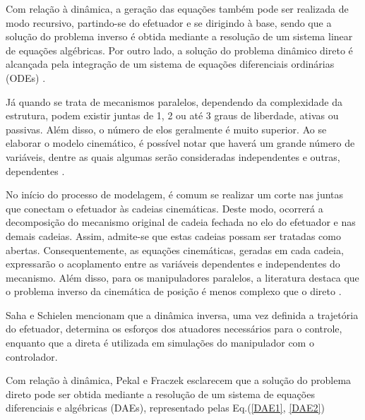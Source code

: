 \documentclass[]{politex}
\begin{document}
Com relação à dinâmica, a geração das equações também pode ser realizada de modo recursivo, partindo-se do efetuador e se dirigindo à base, sendo que a solução do problema inverso é obtida mediante a resolução de um sistema linear de equações algébricas. Por outro lado, a solução do problema dinâmico direto é alcançada pela integração de um sistema de equações diferenciais ordinárias (ODEs) \cite{Featherstone}.





Já quando se trata de mecanismos paralelos, dependendo da complexidade da estrutura, podem existir juntas de 1, 2 ou até 3 graus de liberdade, ativas ou passivas. Além disso, o número de elos geralmente é muito superior. Ao se elaborar o modelo cinemático, é possível notar que haverá um grande número de variáveis, dentre as quais algumas serão consideradas independentes e outras, dependentes \cite{Merlet}.

No início do processo de modelagem, é comum  se realizar um corte nas juntas que conectam o efetuador às cadeias cinemáticas. Deste modo, ocorrerá a decomposição do mecanismo original de cadeia fechada no elo do efetuador e nas demais cadeias. Assim, admite-se que estas cadeias possam ser tratadas como abertas. Consequentemente, as equações cinemáticas, geradas em cada cadeia, expressarão o acoplamento entre as variáveis dependentes e independentes do mecanismo. Além disso, para os manipuladores paralelos, a literatura destaca que o problema inverso da cinemática de posição é menos complexo que o direto \cite{Merlet}. 

Saha e Schielen \cite{Saha} mencionam que a dinâmica inversa, uma vez definida a trajetória do efetuador, determina os esforços dos atuadores necessários para o controle, enquanto que a direta é utilizada em simulações do manipulador com o controlador.

Com relação à dinâmica, Pekal e Fraczek \cite{Pekal2} esclarecem que a solução do problema direto pode ser obtida mediante a resolução de um sistema de equações diferenciais e algébricas (DAEs), representado pelas Eq.(\ref{DAE1}, \ref{DAE2})
\end{document}
